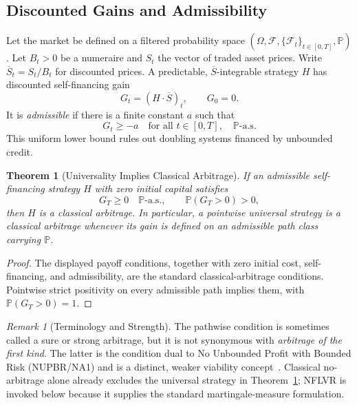 \documentclass[aps,pra,reprint,superscriptaddress,amsmath,amssymb,floatfix]{revtex4-2}
\theoremstyle{plain}
\newtheorem{theorem}{Theorem}
\theoremstyle{definition}
\theoremstyle{remark}
\newtheorem{remark}{Remark}
\begin{document}
\subsection{Discounted Gains and Admissibility}

Let the market be defined on a filtered probability space
\((\Omega,\mathcal{F},\{\mathcal{F}_t\}_{t\in[0,T]},\mathbb{P})\).
Let \(B_t>0\) be a numeraire and \(S_t\) the vector of traded asset prices.
Write \(\overline S_t=S_t/B_t\) for discounted prices. A predictable,
\(\overline S\)-integrable strategy \(H\) has discounted self-financing gain
\begin{equation}
  G_t=(H\mathbin{\cdot}\overline S)_t,\qquad G_0=0.
  \label{eq:gain}
\end{equation}
It is \emph{admissible} if there is a finite constant \(a\) such that
\begin{equation}
  G_t\geq -a\quad\text{for all }t\in[0,T],\quad\mathbb{P}\text{-a.s.}
  \label{eq:admissible}
\end{equation}
This uniform lower bound rules out doubling systems financed by unbounded
credit.

\begin{theorem}[Universality Implies Classical Arbitrage]
  \label{thm:arbitrage}
  If an admissible self-financing strategy \(H\) with zero initial capital
  satisfies
  \[
    G_T\geq0\quad\mathbb{P}\text{-a.s.},
    \qquad
    \mathbb{P}(G_T>0)>0,
  \]
  then \(H\) is a classical arbitrage. In particular, a pointwise universal
  strategy is a classical arbitrage whenever its gain is defined on an
  admissible path class carrying \(\mathbb{P}\).
\end{theorem}

\begin{proof}
The displayed payoff conditions, together with zero initial cost,
self-financing, and admissibility, are the standard classical-arbitrage
conditions. Pointwise strict positivity on every admissible path implies them,
with \(\mathbb{P}(G_T>0)=1\).
\end{proof}

\begin{remark}[Terminology and Strength]
The pathwise condition is sometimes called a sure or strong arbitrage, but it
is not synonymous with \emph{arbitrage of the first kind}. The latter is the
condition dual to No Unbounded Profit with Bounded Risk (NUPBR/NA1) and is a
distinct, weaker viability concept~\cite{Kardaras2012}. Classical
no-arbitrage alone already excludes the universal strategy in
Theorem~\ref{thm:arbitrage}; NFLVR is invoked below because it supplies the
standard martingale-measure formulation.
\end{remark}
\end{document}
